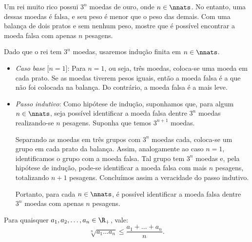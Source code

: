 \begin{example}
Um rei muito rico possui $3^n$ moedas de ouro, onde $n \in \nnats$. No entanto, uma dessas moedas é falsa, e seu peso é menor que o peso das demais. Com uma balança de dois pratos e sem nenhum peso, mostre que é possível encontrar a moeda falsa com apenas $n$ pesagens.
\end{example}

\begin{solution}
Dado que o rei tem $3^n$ moedas, usaremos indução finita em $n \in \nnats$. 

\begin{itemize}
	\item \textit{Caso base} [$n=1$]: Para $n=1$, ou seja, três moedas, coloca-se uma moeda em cada prato. Se as moedas tiverem pesos iguais, então a moeda falsa é a que não foi colocada na balança. Do contrário, a moeda falsa é a mais leve.

	\item \textit{Passo indutivo}: Como hipótese de indução, suponhamos que, para algum $n \in \nnats$, seja possível identificar a moeda falsa dentre $3^n$ moedas realizando-se $n$ pesagens. Suponha que temos $3^{n+1}$ moedas. 

	Separando as moedas em três grupos com $3^n$ moedas cada, coloca-se um grupo em cada prato da balança. Assim, analogamente ao caso $n = 1$, identificamos o grupo com a moeda falsa. Tal grupo tem $3^n$ moedas e, pela hipótese de indução, pode-se identificar a moeda falsa com mais $n$  pesagens, totalizando $n+1$ pesagens. Concluímos assim a veracidade do passo indutivo.

		Portanto, para cada $n \in \nnats$, é possível identificar a moeda falsa dentre $3^n$ moedas com apenas $n$ pesagens.
\end{itemize}
\end{solution}

\begin{theorem}
Para quaisquer $a_1, a_2, \dots , a_n \in \R_+$, vale:
%
\begin{equation*}
    \sqrt[n]{a_1\dots a_n} \le \frac {a_1 + \dots + a_n} n.
\end{equation*}
\end{theorem}

